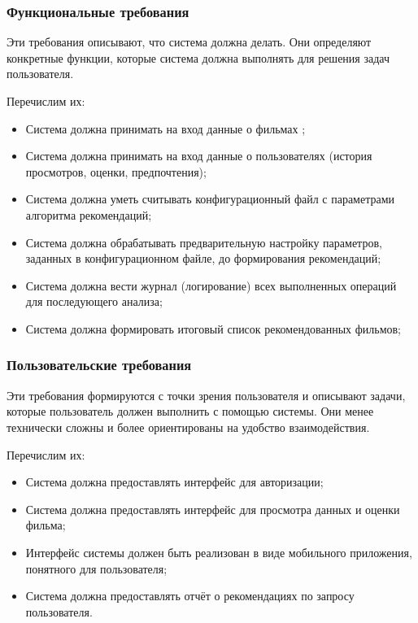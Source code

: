 \subsubsection{Функциональные требования}

Эти требования описывают, что система должна делать. Они определяют конкретные функции,
которые система должна выполнять для решения задач пользователя.

Перечислим их:

\begin{itemize}
	\item Система должна принимать на вход данные о фильмах ;
	\item Система должна принимать на вход данные о пользователях (история просмотров, оценки, предпочтения);
	\item Система должна уметь считывать конфигурационный файл с параметрами алгоритма рекомендаций;
	\item Система должна обрабатывать предварительную настройку параметров, заданных в конфигурационном файле, до формирования рекомендаций;
	\item Система должна вести журнал (логирование) всех выполненных операций для последующего анализа;
	\item Система должна формировать итоговый список рекомендованных фильмов;
\end{itemize}

\subsubsection{Пользовательские требования}

Эти требования формируются с точки зрения пользователя и описывают задачи,
которые пользователь должен выполнить с помощью системы.
Они менее технически сложны и более ориентированы на удобство взаимодействия.

Перечислим их:

\begin{itemize}
	\item Система должна предоставлять интерфейс для авторизации;
	\item Система должна предоставлять интерфейс для просмотра данных и оценки фильма;
	\item Интерфейс системы должен быть реализован в виде мобильного приложения, понятного для пользователя;
	\item Система должна предоставлять отчёт о рекомендациях по запросу пользователя.
\end{itemize}

